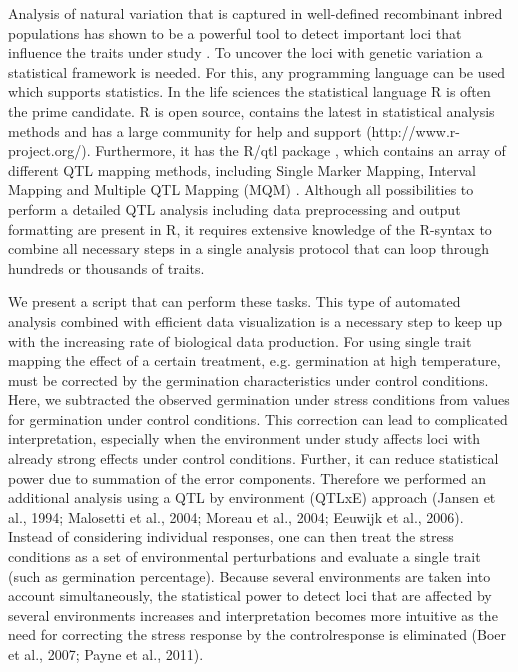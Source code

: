 Analysis of natural variation that is captured in well-defined recombinant inbred populations has 
shown to be a powerful tool to detect important loci that influence the traits under study 
\cite{Alonso-Blanco:2009}. To uncover the loci with genetic variation a statistical framework is 
needed. For this, any programming language can be used which supports statistics. In the life sciences 
the statistical language R is often the prime candidate. R is open source, contains the latest in 
statistical analysis methods and has a large community for help and support (http://www.r-project.org/). 
Furthermore, it has the R/qtl package \cite{Broman:2003}, which contains an array of different 
QTL mapping methods, including Single Marker Mapping, Interval Mapping and Multiple QTL Mapping (MQM) 
\cite{Arends:2010}. Although all possibilities to perform a detailed QTL analysis including data 
preprocessing and output formatting are present in R, it requires extensive knowledge of the R-syntax 
to combine all necessary steps in a single analysis protocol that can loop through hundreds or 
thousands of traits. 

We present a script that can perform these tasks. This type of automated analysis combined with 
efficient data visualization is a necessary step to keep up with the increasing rate of biological 
data production. For using single trait mapping the effect of a certain treatment, e.g. germination 
at high temperature, must be corrected by the germination characteristics under control conditions. 
Here, we subtracted the observed germination under stress conditions from values for germination 
under control conditions. This correction can lead to complicated interpretation, especially when the 
environment under study affects loci with already strong effects under control conditions. Further, 
it can reduce statistical power due to summation of the error components. Therefore we performed an 
additional analysis using a QTL by environment (QTLxE) approach (Jansen et al., 1994; 
Malosetti et al., 2004; Moreau et al., 2004; Eeuwijk et al., 2006). Instead of considering individual 
responses, one can then treat the stress conditions as a set of environmental perturbations and 
evaluate a single trait (such as germination percentage). Because several environments are taken 
into account simultaneously, the statistical power to detect loci that are affected by several 
environments increases and interpretation becomes more intuitive as the need for correcting the 
stress response by the controlresponse is eliminated (Boer et al., 2007; Payne et al., 2011).

